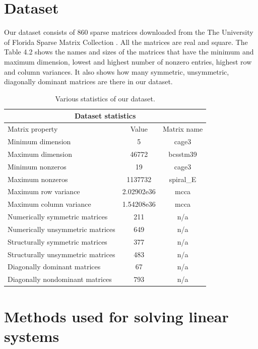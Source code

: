 \section{Dataset}

Our dataset consists of 860 sparse matrices downloaded from the The University of Florida Sparse Matrix Collection \cite{florida}. All the matrices are real and square. The Table 4.2 shows the names and sizes of the matrices that have the minimum and maximum dimension, lowest and highest number of nonzero entries, highest row and column variances. It also shows how many symmetric, unsymmetric, diagonally dominant matrices are there in our dataset.

\begin{table}[H]
 \centering
    \begin{tabular}{| l | c | c |}
    \hline
    \multicolumn{3}{|c|}{Dataset statistics} \\
    \hline
    \hline
    Matrix property & Value & Matrix name \\ \hline
    Minimum dimension & 5\texttimes5 & cage3  \\ \hline
    Maximum dimension & 46772\texttimes46772 & bcsstm39  \\ \hline
    Minimum nonzeros & 19 & cage3  \\ \hline
    Maximum nonzeros & 1137732 & spiral\_E  \\ \hline
    Maximum row variance & 2.02902e36 & mcca  \\ \hline
    Maximum column variance & 1.54208e36 & mcca  \\ \hline
    Numerically symmetric matrices & 211 & n/a \\ \hline
    Numerically unsymmetric matrices & 649 &  n/a  \\ \hline
    Structurally symmetric matrices & 377 & n/a \\ \hline
    Structurally unsymmetric matrices & 483 &  n/a  \\ \hline
    Diagonally dominant matrices & 67 & n/a \\ \hline
    Diagonally nondominant matrices & 793 &  n/a  \\ \hline
   \end{tabular}
   \caption{Various statistics of our dataset.}
   \label{tab:dataset}
\end{table}

\section{Methods used for solving linear systems}

